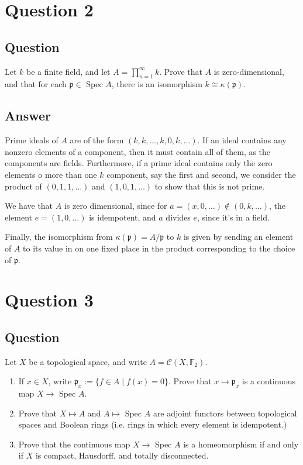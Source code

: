\documentclass[11pt]{article}
\begin{document}
\section{Question 2}
\subsection{Question}
Let $k$ be a finite field, and let $A = \prod _{n=1}^\infty k$. Prove that $A$ is zero-dimensional, and that for each $\mathfrak{p} \in $ Spec $A$, there is an isomorphism $k \cong \kappa(\mathfrak{p})$.
\subsection{Answer}

Prime ideals of $A$ are of the form $(k,k,\dots,k,0,k,\dots)$. If  an ideal contains any nonzero elements of a component, then it must contain all of them, as the components are fields. Furthermore, if a prime ideal contains only the zero elements o more than one $k$ component, say the first and second, we consider the product of $(0,1,1,\dots)$ and $(1,0,1,\dots)$ to show that this is not prime.

We have that $A$ is zero dimensional, since for $a= (x,0,\dots) \notin (0,k,\dots) $, the element $e=(1,0,\dots)$ is idempotent, and $a$ divides $e$, since it's in a field. 

Finally, the isomorphism from $\kappa(\mathfrak{p})  = A/ \mathfrak{p} $ to $k$ is given by sending an element of $A$ to its value in on one fixed place in the product corresponding to the choice of  $\mathfrak p$.

\section{Question 3}
\subsection{Question}
Let $X$ be a topological space, and write $A  = \mathcal{C}(X,\mathbb{F}_2)$.
\begin{enumerate}
\item If $x \in X$, write $\mathfrak{p}_x := \{ f \in A \mid f(x) = 0\}$. Prove that $x \mapsto \mathfrak{p}_x$ is a continuous map $X \to $ Spec $A$.
\item Prove that $X \mapsto A$ and $A \mapsto$ Spec $A$ are adjoint functors between topological spaces and Boolean rings (i.e. rings in which every element is idempotent.)
\item Prove that the continuous map $X \to $ Spec $A$ is a homeomorphism if and only if $X$ is compact, Hausdorff, and totally disconnected.
\end{enumerate}
\end{document}
